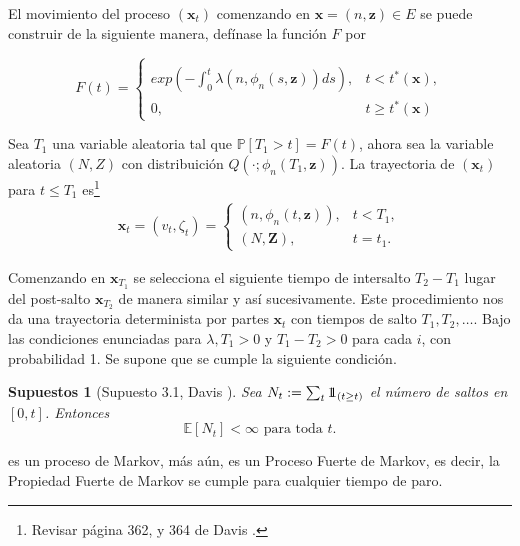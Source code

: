 \documentclass{article}
\newtheorem{Sup}{Supuestos}
\newcommand{\esp}{\mathbb{E}}
\newcommand{\prob}{\mathbb{P}}
\newcommand{\indora}{\mbox{$1$\hspace{-0.8ex}$1$}}
\begin{document}
El movimiento del proceso $\left(\mathbf{x}_{t}\right)$ comenzando
en $\mathbf{x}=\left(n,\mathbf{z}\right)\in E$ se puede construir
de la siguiente manera, def\'inase la funci\'on $F$ por

\begin{equation}
F\left(t\right)=\left\{\begin{array}{ll}\\
exp\left(-\int_{0}^{t}\lambda\left(n,\phi_{n}\left(s,\mathbf{z}\right)\right)ds\right), & t<t^{*}\left(\mathbf{x}\right),\\
0, & t\geq t^{*}\left(\mathbf{x}\right)
\end{array}\right.
\end{equation}

Sea $T_{1}$ una variable aleatoria tal que
$\prob\left[T_{1}>t\right]=F\left(t\right)$, ahora sea la variable
aleatoria $\left(N,Z\right)$ con distribuici\'on
$Q\left(\cdot;\phi_{n}\left(T_{1},\mathbf{z}\right)\right)$. La
trayectoria de $\left(\mathbf{x}_{t}\right)$ para $t\leq T_{1}$
es\footnote{Revisar p\'agina 362, y 364 de Davis \cite{Davis}.}
\begin{eqnarray*}
\mathbf{x}_{t}=\left(v_{t},\zeta_{t}\right)=\left\{\begin{array}{ll}
\left(n,\phi_{n}\left(t,\mathbf{z}\right)\right), & t<T_{1},\\
\left(N,\mathbf{Z}\right), & t=t_{1}.
\end{array}\right.
\end{eqnarray*}

Comenzando en $\mathbf{x}_{T_{1}}$ se selecciona el siguiente
tiempo de intersalto $T_{2}-T_{1}$ lugar del post-salto
$\mathbf{x}_{T_{2}}$ de manera similar y as\'i sucesivamente. Este
procedimiento nos da una trayectoria determinista por partes
$\mathbf{x}_{t}$ con tiempos de salto $T_{1},T_{2},\ldots$. Bajo
las condiciones enunciadas para $\lambda,T_{1}>0$  y
$T_{1}-T_{2}>0$ para cada $i$, con probabilidad 1. Se supone que
se cumple la siguiente condici\'on.

\begin{Sup}[Supuesto 3.1, Davis \cite{Davis}]\label{Sup3.1.Davis}
Sea $N_{t}:=\sum_{t}\indora_{\left(t\geq t\right)}$ el n\'umero de
saltos en $\left[0,t\right]$. Entonces
\begin{equation}
\esp\left[N_{t}\right]<\infty\textrm{ para toda }t.
\end{equation}
\end{Sup}

es un proceso de Markov, m\'as a\'un, es un Proceso Fuerte de
Markov, es decir, la Propiedad Fuerte de Markov se cumple para
cualquier tiempo de paro.
\end{document}

